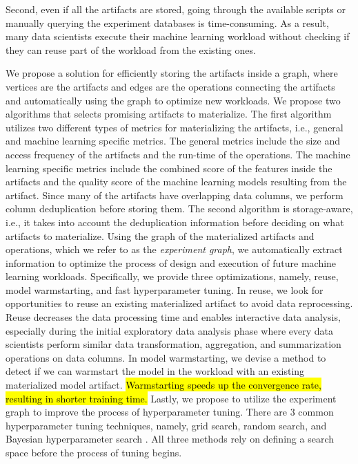 Second, even if all the artifacts are stored, going through the available scripts or manually querying the experiment databases is time-consuming. 
As a result, many data scientists execute their machine learning workload without checking if they can reuse part of the workload from the existing ones. 

We propose a solution for efficiently storing the artifacts inside a graph, where vertices are the artifacts and edges are the operations connecting the artifacts and automatically using the graph to optimize new workloads.
We propose two algorithms that selects promising artifacts to materialize.
The first algorithm utilizes two different types of metrics for materializing the artifacts, i.e., general and machine learning specific metrics.
The general metrics include the size and access frequency of the artifacts and the run-time of the operations.
The machine learning specific metrics include the combined score of the features inside the artifacts and the quality score of the machine learning models resulting from the artifact.
Since many of the artifacts have overlapping data columns, we perform column deduplication before storing them.
The second algorithm is storage-aware, i.e., it takes into account the deduplication information before deciding on what artifacts to materialize.
Using the graph of the materialized artifacts and operations, which we refer to as the \textit{experiment graph}, we automatically extract information to optimize the process of design and execution of future machine learning workloads.
Specifically, we provide three optimizations, namely, reuse, model warmstarting, and fast hyperparameter tuning.
In reuse, we look for opportunities to reuse an existing materialized artifact to avoid data reprocessing.
Reuse decreases the data processing time and enables interactive data analysis, especially during the initial exploratory data analysis phase where every data scientists perform similar data transformation, aggregation, and summarization operations on data columns.
In model warmstarting, we devise a method to detect if we can warmstart the model in the workload with an existing materialized model artifact.
\hl{Warmstarting speeds up the convergence rate, resulting in shorter training time.}
Lastly, we propose to utilize the experiment graph to improve the process of hyperparameter tuning.
There are 3 common hyperparameter tuning techniques, namely, grid search, random search, and Bayesian hyperparameter search \cite{hutter2011sequential,snoek2012practical}.
All three methods rely on defining a search space before the process of tuning begins.
